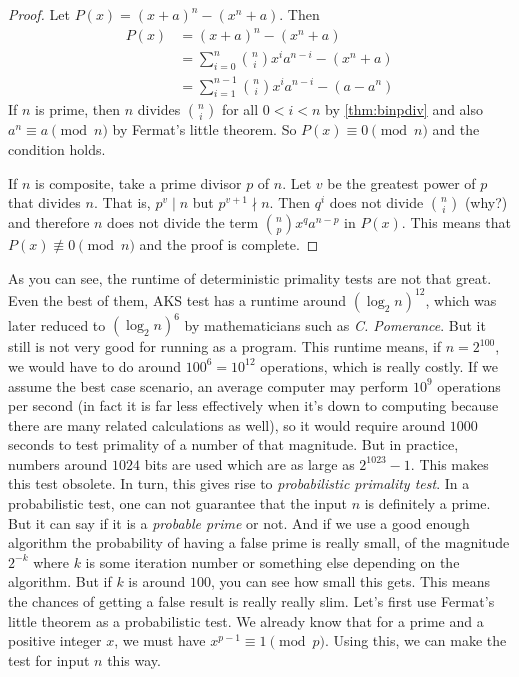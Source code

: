 	\begin{proof}
		Let $P(x) = (x+a)^n - \left(x^n + a\right)$. Then
			\begin{align*}
				P(x) &= (x+a)^n - \left(x^n + a\right)\\
				 &= \sum_{i=0}^{n} \binom{n}{i} x^i a^{n-i} - \left(x^n + a\right)\\
				 &= \sum_{i=1}^{n-1} \binom{n}{i} x^i a^{n-i} - \left(a - a^n\right)
			\end{align*}
		If $n$ is prime, then $n$ divides $\binom{n}{i}$ for all $0<i<n$ by \autoref{thm:binpdiv} and also $a^n \equiv a \pmod n$ by Fermat's little theorem. So $P(x) \equiv 0 \pmod n$ and the condition holds.

		If $n$ is composite, take a prime divisor $p$ of $n$. Let $v$ be the greatest power of $p$ that divides $n$. That is, $p^v \mid n$ but $p^{v+1} \nmid n$. Then $q^i$ does not divide $\binom{n}{i}$ (why?) and therefore $n$ does not divide the term $\binom{n}{p}x^qa^{n-p}$ in $P(x)$. This means that $P(x) \not \equiv 0 \pmod n$ and the proof is complete.
	\end{proof}
As you can see, the runtime of deterministic primality tests are not that great. Even the best of them, AKS test has a runtime around $(\log_2n)^{12}$, which was later reduced to $(\log_2n)^6$ by mathematicians such as \textit{C. Pomerance}. But it still is not very good for running as a program. This runtime means, if $n=2^{100}$, we would have to do around $100^6=10^{12}$ operations, which is really costly. If we assume the best case scenario, an average computer may perform $10^9$ operations per second (in fact it is far less effectively when it's down to computing because there are many related calculations as well), so it would require around $1000$ seconds to test primality of a number of that magnitude. But in practice, numbers around $1024$ bits are used which are as large as $2^{1023}-1$. This makes this test obsolete. In turn, this gives rise to \textit{probabilistic primality test}. In a probabilistic test, one can not guarantee that the input $n$ is definitely a prime. But it can say if it is a \textit{probable prime} or not. And if we use a good enough algorithm the probability of having a false prime is really small, of the magnitude $2^{-k}$ where $k$ is some iteration number or something else depending on the algorithm. But if $k$ is around $100$, you can see how small this gets. This means the chances of getting a false result is really really slim. Let's first use Fermat's little theorem as a probabilistic test. We already know that for a prime and a positive integer $x$, we must have $x^{p-1}\equiv1\pmod p$. Using this, we can make the test for input $n$ this way.
